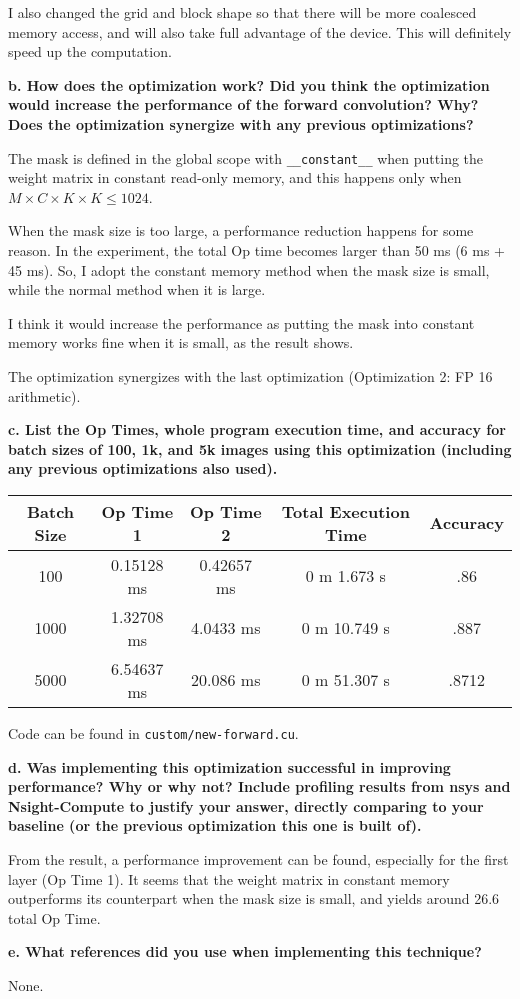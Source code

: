 \documentclass[12pt]{article}
\begin{document}
I also changed the grid and block shape so that there will be more coalesced memory access, and will also take full advantage of the device. This will definitely speed up the computation.

\hfill \break
\noindent \textbf{b. \; How does the optimization work? Did you think the optimization would increase the performance of the forward convolution? Why? Does the optimization synergize with any previous optimizations?}
\hfill \break

The mask is defined in the global scope with \texttt{\_\_constant\_\_} when putting the weight matrix in constant read-only memory, and this happens only when $M \times C \times K \times K \le 1024$.

When the mask size is too large, a performance reduction happens for some reason. In the experiment, the total Op time becomes larger than 50 ms (6 ms + 45 ms). So, I adopt the constant memory method when the mask size is small, while the normal method when it is large.

I think it would increase the performance as putting the mask into constant memory works fine when it is small, as the result shows.

The optimization synergizes with the last optimization (Optimization 2: FP 16 arithmetic).

\hfill \break
\noindent \textbf{c. \; List the Op Times, whole program execution time, and accuracy for batch sizes of 100, 1k, and 5k images using this optimization (including any previous optimizations also used).}
\hfill \break

\begin{table}[!ht]
\begin{longtable}{c|cccc} \toprule
Batch Size & Op Time 1 & Op Time 2 & Total Execution Time & Accuracy \\ \midrule
100  & 0.15128 ms & 0.42657 ms & 0 m 1.673 s & .86 \\
1000 & 1.32708 ms & 4.0433 ms & 0 m 10.749 s & .887 \\
5000 & 6.54637 ms & 20.086 ms & 0 m 51.307 s & .8712 \\
\bottomrule
\end{longtable}
\end{table}

Code can be found in \texttt{custom/new-forward.cu}.

\hfill \break
\noindent \textbf{d. \; Was implementing this optimization successful in improving performance? Why or why not? Include profiling results from nsys and Nsight-Compute to justify your answer, directly comparing to your baseline (or the previous optimization this one is built of).}
\hfill \break

From the result, a performance improvement can be found, especially for the first layer (Op Time 1). It seems that the weight matrix in constant memory outperforms its counterpart when the mask size is small, and yields around 26.6 total Op Time.

\hfill \break
\noindent \textbf{e. \; What references did you use when implementing this technique?}
\hfill \break

None.
\end{document}
